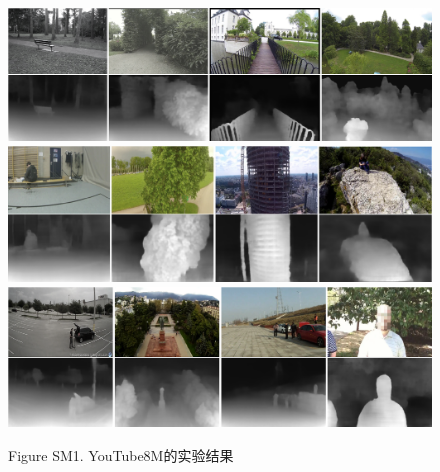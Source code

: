 \documentclass[10pt,journal,compsoc,UTF8]{IEEEtran}
\begin{document}
\begin{figure}[htbp]
  \centering
    \includegraphics[width=0.9\linewidth]{imgs/SM1a.png}\\
    \includegraphics[width=0.9\linewidth]{imgs/SM1b.png}\\
    \includegraphics[width=0.9\linewidth]{imgs/SM1c.png}\\
  \caption*{Figure SM1. YouTube8M的实验结果}
\end{figure}
\ifCLASSOPTIONcaptionsoff
  \newpage
\fi
\end{document}
